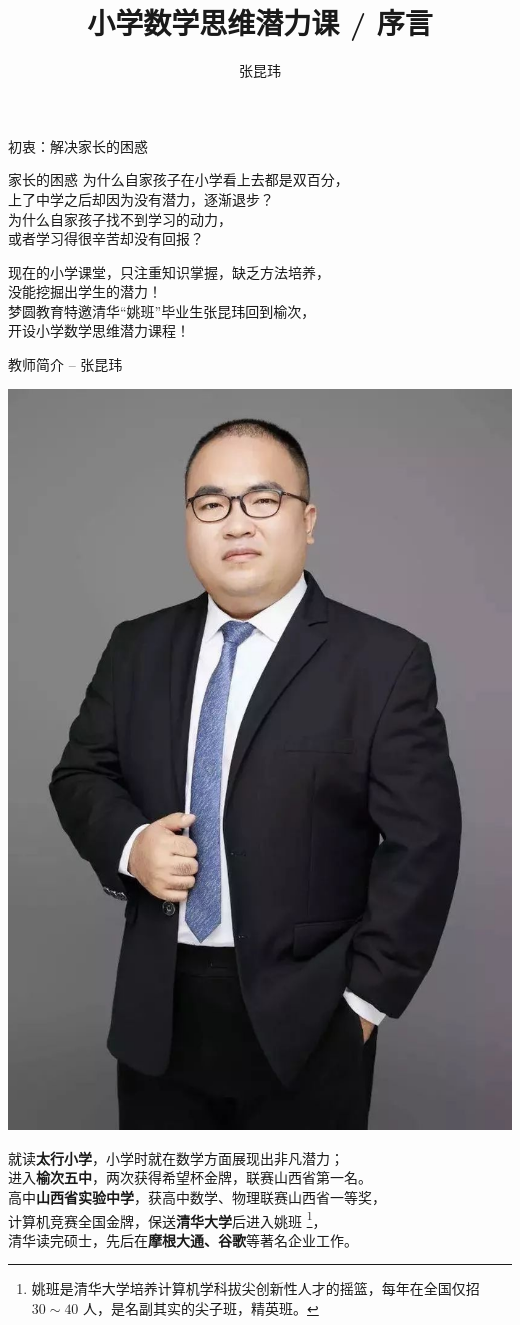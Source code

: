 \documentclass{beamer}
\title{小学数学思维潜力课 / 序言}
\author{张昆玮}
\begin{document}
\begin{frame}
\maketitle
\end{frame}

\begin{frame}{初衷：解决家长的困惑}
\begin{exampleblock}{家长的困惑}
为什么自家孩子在小学看上去都是双百分，\\
\qquad 上了中学之后却因为没有潜力，逐渐退步？\\
\bigbreak
为什么自家孩子找不到学习的动力，\\
\qquad 或者学习得很辛苦却没有回报？\\
\end{exampleblock}
\bigbreak
现在的小学课堂，只注重知识掌握，缺乏方法培养，\\
\qquad 没能挖掘出学生的潜力！\\
\bigbreak
梦圆教育特邀清华“姚班”毕业生张昆玮回到榆次，\\
\qquad 开设小学数学思维潜力课程！\\
\end{frame}

\begin{frame}{教师简介 -- 张昆玮}
\begin{center}
\includegraphics[width=.2\textwidth]{image/照片.jpg}
\end{center}
就读\textbf{太行小学}，小学时就在数学方面展现出非凡潜力；\\
进入\textbf{榆次五中}，两次获得希望杯金牌，联赛山西省第一名。\\
高中\textbf{山西省实验中学}，获高中数学、物理联赛山西省一等奖，\\
计算机竞赛全国金牌，保送\textbf{清华大学}后进入姚班
\footnote{姚班是清华大学培养计算机学科拔尖创新性人才的摇篮，每年在全国仅招 $30 \sim 40$ 人，是名副其实的尖子班，精英班。}，\\
清华读完硕士，先后在\textbf{摩根大通、谷歌}等著名企业工作。
\end{frame}
\end{document}
